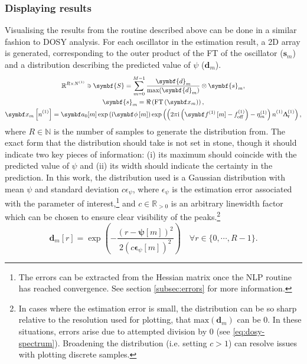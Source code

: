 \subsubsection{Displaying results}
Visualising the results from the routine described above can be done in a
similar fashion to \ac{DOSY} analysis. For each oscillator in the estimation
result, a \ac{2D} array is generated, corresponding to the outer product of the
\ac{FT} of the oscillator ($\symbf{s}_m$) and a distribution describing the
predicted value of $\psi$ ($\symbf{d}_m$).
\begin{subequations}
    \begin{gather}
        \mathbb{R}^{R \times \None} \ni \symbf{S} = \sum_{m=0}^{M-1}
        \frac{\symbf{d}_m}{\text{max}(\symbf{d}_m)} \otimes
        \symbf{s}_m ,\label{eq:dosy-spectrum}\\
        \symbf{s}_m = \Re\left(\FT\left(\bx_m\right)\right),\\
        \bx_m\left[\none\right] = \bda_0[m] \exp\left(\iu \bdphim\right)
        \exp\left(\left(2 \pi \iu \left(\bdfonem - \foffone\right) - \etaonem \right) \none \Dtone\right),
    \end{gather}
\end{subequations}
where $R \in \mathbb{N}$ is the number of samples to generate the distribution from.
The exact form that the distribution should take is not set in stone, though it
should indicate two key pieces of information:
(i) its maximum should coincide with the predicted value of $\psi$ and (ii) its
width should indicate the certainty in the prediction. In this work, the
distribution used is a Gaussian distribution with mean $\psi$ and standard
deviation $c \epsilon_{\psi}$, where $\epsilon_{\psi}$ is the
estimation error associated with the parameter of interest,\footnote{
    The errors can be extracted from the Hessian matrix once the \ac{NLP}
    routine has reached convergence. See section \ref{subsec:errors} for more
    information.
}
and $c \in \mathbb{R}_{>0}$ is an arbitrary linewidth factor which can be chosen
to ensure clear visibility of the peaks.\footnote{
    In cases where the estimation error is small, the distribution can be
    so sharp relative to the resolution used for plotting, that
    $\text{max}(\symbf{d}_m)$ can be $0$. In these situations, errors arise due
    to attempted division by $0$ (see \eqref{eq:dosy-spectrum}). Broadening the
    distribution (i.e. setting $c > 1$) can resolve issues with plotting
    discrete samples.
}
\begin{equation}
    \symbf{d}_m\left[ r \right] = \exp\left(
        - \frac{\left(r - \symbf{\psi}[m]\right)^2}{2 \left(c \symbf{\epsilon}_{\psi}[m]\right)^2}
    \right)\quad \forall r \in \lbrace 0, \cdots, R-1 \rbrace.
\end{equation}

